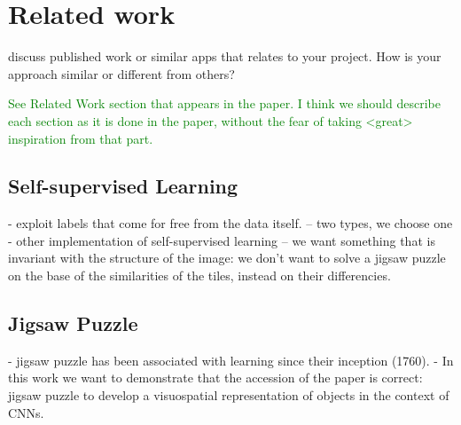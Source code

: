 \section{Related work}
discuss published work or similar apps that relates to your project. How is your approach similar or different from others? 

\textcolor{green}{See Related Work section that appears in the paper. I think we should describe each section as it is done in the paper, without the fear of taking <great> inspiration from that part.}

\subsection{Self-supervised Learning}
- exploit labels that come for free from the data itself.
-- two types, we choose one
- other implementation of self-supervised learning
-- we want something that is invariant with the structure of the image: we don't want to solve a jigsaw puzzle on the base of the similarities of the tiles, instead on their differencies. 

\subsection{Jigsaw Puzzle}
- jigsaw puzzle has been associated with learning since their inception (1760).
- In this work we want to demonstrate that the accession of the paper is correct: jigsaw puzzle to develop a visuospatial representation of objects in the context of CNNs.


